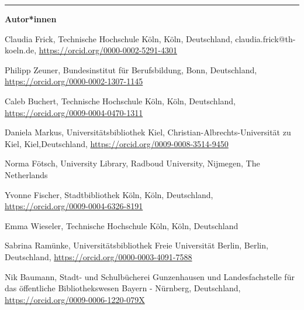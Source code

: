 \begin{center}\rule{0.5\linewidth}{0.5pt}\end{center}

\textbf{Autor*innen}

Claudia Frick, Technische Hochschule Köln, Köln, Deutschland, claudia.frick@th-koeln.de, \url{https://orcid.org/0000-0002-5291-4301}

Philipp Zeuner, Bundesinstitut für Berufsbildung, Bonn, Deutschland, \url{https://orcid.org/0000-0002-1307-1145}

Caleb Buchert, Technische Hochschule Köln, Köln, Deutschland, \url{https://orcid.org/0009-0004-0470-1311}

Daniela Markus, Universitätsbibliothek Kiel, Christian-Albrechts-Universität zu Kiel, Kiel,\linebreak Deutschland, \url{https://orcid.org/0009-0008-3514-9450}

Norma Fötsch, University Library, Radboud University, Nijmegen, The Netherlands

Yvonne Fischer, Stadtbibliothek Köln, Köln, Deutschland, \url{https://orcid.org/0009-0004-6326-8191}

Emma Wieseler, Technische Hochschule Köln, Köln, Deutschland

Sabrina Ramünke, Universitätsbibliothek Freie Universität Berlin, Berlin, Deutschland, \url{https://orcid.org/0000-0003-4091-7588}

Nik Baumann, Stadt- und Schulbücherei Gunzenhausen und Landesfachstelle für das öffentliche Bibliothekswesen Bayern - Nürnberg, Deutschland, \url{https://orcid.org/0009-0006-1220-079X}
